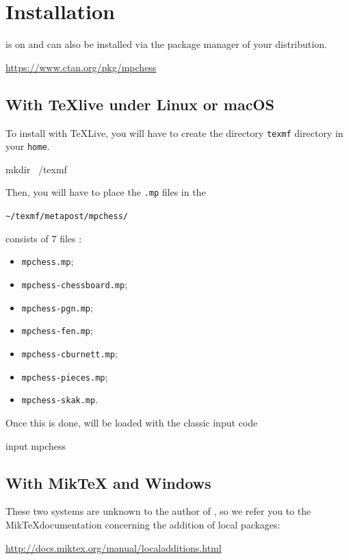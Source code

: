 \documentclass[english]{ltxdoc}
\begin{document}
\section{Installation}

\mpchess is on \ctan{} and can also be installed via the package manager of your
distribution.

\begin{center}
  \url{https://www.ctan.org/pkg/mpchess}
\end{center}


\subsection{With \TeX live under Linux or macOS}

To install \mpchess with \TeX Live, you will have to create the directory
\lstinline+texmf+ directory in your \lstinline+home+. 

\begin{commandshell}
mkdir ~/texmf
\end{commandshell}

Then, you will have to place the \lstinline+.mp+ files in the 
\begin{center}
  \lstinline+~/texmf/metapost/mpchess/+
\end{center}

\mpchess consists of 7 files  :
\begin{itemize}
  \item \verb+mpchess.mp+;
  \item \verb+mpchess-chessboard.mp+;
  \item \verb+mpchess-pgn.mp+;
  \item \verb+mpchess-fen.mp+;
  \item \verb+mpchess-cburnett.mp+;
  \item \verb+mpchess-pieces.mp+;
  \item \verb+mpchess-skak.mp+.
\end{itemize}

Once this is done, \mpchess will be loaded with the classic \MP
input code
\begin{mpcode}
input mpchess
\end{mpcode}

\subsection{With Mik\TeX{} and Windows}

These two systems are unknown to the author of \mpchess, so we
refer you to the Mik\TeX documentation concerning the addition of local packages:
\begin{center}
  \url{http://docs.miktex.org/manual/localadditions.html}
\end{center}
\end{document}
